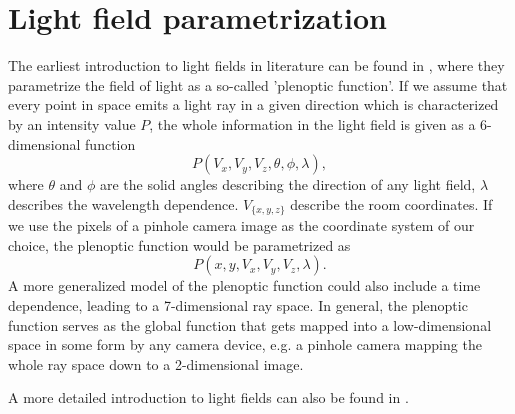 \documentclass  [
  paper    = a4,
  BCOR     = 10mm,
  twoside,
  fontsize = 12pt,
  fleqn,
  toc      = bibnumbered,
  toc      = listofnumbered,
  numbers  = noendperiod,
  headings = normal,
  listof   = leveldown,
  version  = 3.03
]                                       {scrreprt}
\begin{document}
\section{Light field parametrization}
The earliest introduction to light fields in literature can be found in \cite{adelson1991plenoptic}, where they parametrize the field of light as a  so-called 'plenoptic function'. If we assume that every point in space emits a light ray  in a given direction which is characterized by an intensity value $P$, the whole information in the light field is given as a 6-dimensional function
\begin{equation}\label{key}
P(V_x,V_y, V_z, \theta, \phi, \lambda),
\end{equation}
where $\theta$ and $\phi$ are the solid angles describing the direction of any light field, $\lambda$ describes the wavelength dependence. $V_{\{x,y,z\}}$ describe the room coordinates. If we use the pixels of a pinhole camera image as the coordinate system of our choice, the plenoptic function would be parametrized as 
\begin{equation}\label{eq:plenoptic}
P(x,y, V_x, V_y, V_z, \lambda).
\end{equation}
 A more generalized model of the plenoptic function could also include a time dependence, leading to a 7-dimensional ray space. In general, the plenoptic function serves as the global function that gets mapped into a low-dimensional space in some form by any camera device, e.g. a pinhole camera mapping the whole ray space down to a 2-dimensional image.\\
 	
 A more detailed introduction to light fields can also be found in \cite{wanner2014orientation}. 
\end{document}
